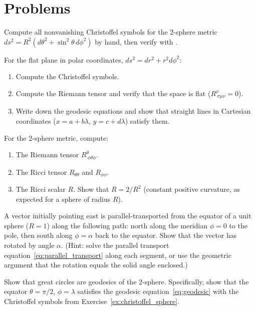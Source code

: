 \section{Problems}
\label{sec:dg_problems}

\begin{exercise}
\label{ex:christoffel_sphere}
Compute all nonvanishing Christoffel symbols for the 2-sphere metric
$ds^2 = R^2(d\theta^2 + \sin^2\theta\, d\phi^2)$ by hand, then verify
with .
\end{exercise}

\begin{exercise}
\label{ex:christoffel_polar}
For the flat plane in polar coordinates, $ds^2 = dr^2 + r^2 d\phi^2$:
\begin{enumerate}[label=(\alph*)]
    \item Compute the Christoffel symbols.
    \item Compute the Riemann tensor and verify that the space is flat
          ($R^\rho_{\ \sigma\mu\nu} = 0$).
    \item Write down the geodesic equations and show that straight lines
          in Cartesian coordinates ($x = a + b\lambda$, $y = c + d\lambda$)
          satisfy them.
\end{enumerate}
\end{exercise}

\begin{exercise}
\label{ex:ricci_sphere}
For the 2-sphere metric, compute:
\begin{enumerate}[label=(\alph*)]
    \item The Riemann tensor $R^\theta_{\ \phi\theta\phi}$.
    \item The Ricci tensor $R_{\theta\theta}$ and $R_{\phi\phi}$.
    \item The Ricci scalar $R$.  Show that $R = 2/R^2$ (constant
          positive curvature, as expected for a sphere of radius $R$).
\end{enumerate}
\end{exercise}

\begin{exercise}
\label{ex:parallel_transport_sphere}
A vector initially pointing east is parallel-transported from the equator
of a unit sphere ($R = 1$) along the following path: north along the
meridian $\phi = 0$ to the pole, then south along $\phi = \alpha$ back to
the equator.  Show that the vector has rotated by angle $\alpha$.
(Hint: solve the parallel transport equation~\eqref{eq:parallel_transport}
along each segment, or use the geometric argument that the rotation equals
the solid angle enclosed.)
\end{exercise}

\begin{exercise}
\label{ex:geodesic_sphere}
Show that great circles are geodesics of the 2-sphere.
Specifically, show that the equator $\theta = \pi/2$, $\phi = \lambda$
satisfies the geodesic equation~\eqref{eq:geodesic} with the Christoffel
symbols from Exercise~\ref{ex:christoffel_sphere}.
\end{exercise}
